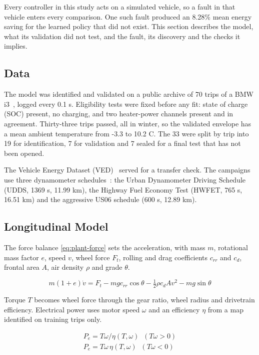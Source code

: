 \documentclass{ieeeaccess}
\begin{document}
Every controller in this study acts on a simulated vehicle, so a fault in that vehicle enters every comparison. One such fault produced an 8.28\% mean energy saving for the learned policy that did not exist. This section describes the model, what its validation did not test, and the fault, its discovery and the checks it implies.

\subsection{Data}

The model was identified and validated on a public archive of 70 trips of a BMW i3~\cite{i3data}, logged every 0.1 s. Eligibility tests were fixed before any fit: state of charge (SOC) present, no charging, and two heater-power channels present and in agreement. Thirty-three trips passed, all in winter, so the validated envelope has a mean ambient temperature from -3.3 to 10.2 \textdegree{}C. The 33 were split by trip into 19 for identification, 7 for validation and 7 sealed for a final test that has not been opened.

The Vehicle Energy Dataset (VED)~\cite{ved} served for a transfer check. The campaigns use three dynamometer schedules~\cite{epacycles}: the Urban Dynamometer Driving Schedule (UDDS, 1369 s, 11.99 km), the Highway Fuel Economy Test (HWFET, 765 s, 16.51 km) and the aggressive US06 schedule (600 s, 12.89 km).

\subsection{Longitudinal Model}

The force balance \eqref{eq:plant-force} sets the acceleration, with mass $m$, rotational mass factor $e$, speed $v$, wheel force $F_{t}$, rolling and drag coefficients $c_{rr}$ and $c_{d}$, frontal area $A$, air density $\rho$ and grade $\theta$.

\begin{equation}
\label{eq:plant-force}
m(1+e)\dot{v} = F_{t} - m g c_{rr}\cos\theta - \tfrac{1}{2}\rho c_{d} A v^{2} - m g \sin\theta
\end{equation}

Torque $T$ becomes wheel force through the gear ratio, wheel radius and drivetrain efficiency. Electrical power uses motor speed $\omega$ and an efficiency $\eta$ from a map identified on training trips only.

\begin{equation}
\label{eq:plant-motor}
\begin{gathered}P_{e} = T\omega/\eta(T,\omega) \;\; (T\omega > 0) \\ P_{e} = T\omega\,\eta(T,\omega) \;\; (T\omega < 0)\end{gathered}
\end{equation}
\end{document}
